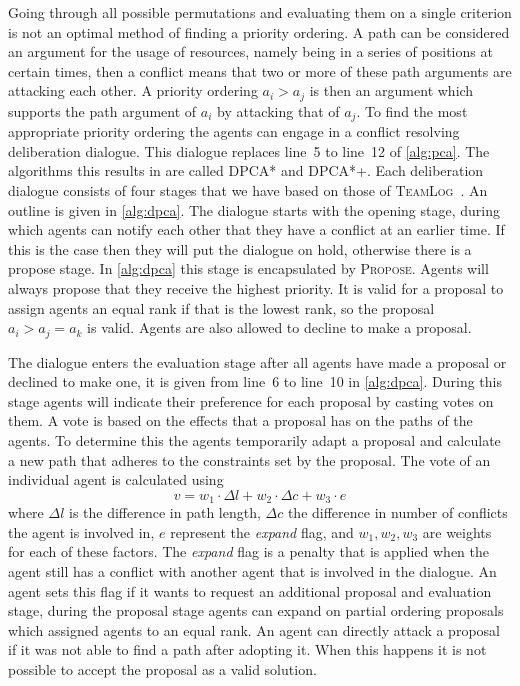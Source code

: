 Going through all possible permutations and evaluating them on a single
criterion is not an optimal method of finding a priority ordering. A path can 
be 
considered an argument for the usage of resources, namely being in a series of 
positions at certain times, then a conflict means that two or more of these path 
arguments are attacking each other. A 
priority ordering $a_i > a_j$ is then an argument which supports the path 
argument 
of $a_i$ by attacking that of $a_j$. To find the most appropriate priority 
ordering the agents can engage in a conflict resolving deliberation dialogue. 
This 
dialogue replaces line~5 to line~12 of \autoref{alg:pca}.
The algorithms this results in are called DPCA* and DPCA*+. Each deliberation 
dialogue consists of four stages that we have based on those of 
\textsc{TeamLog}~\cite{dunin-keplicz2011}. An outline is given in \autoref{alg:dpca}. The dialogue 
starts with the opening stage, during which agents can notify each other that 
they have a conflict at an earlier time. If this is the case then they will put 
the dialogue on hold, otherwise there is a propose stage. In \autoref{alg:dpca} 
this stage is encapsulated by \textsc{Propose}. Agents will always propose that 
they receive the highest priority. It is valid for a proposal to assign agents 
an equal rank if that is the lowest rank, so the proposal $a_i > a_j = a_k$ is 
valid. Agents are 
also allowed to decline to make a proposal.

The dialogue enters the evaluation stage after all agents have made a 
proposal or declined to make one, it is given from line~6 to line~10 in 
\autoref{alg:dpca}. During this stage agents will indicate their preference for 
each proposal by casting votes on them. A vote is based on the effects that a 
proposal has on the paths of the agents. To determine this the agents 
temporarily adapt a proposal and calculate a new path that adheres to the 
constraints set by the proposal.
The vote of an individual agent is calculated using
\[ v = w_1 \cdot \Delta l + w_2 \cdot \Delta c + w_3 \cdot e \]
where $\Delta l$ is the difference in path length, $\Delta c$ the difference in 
number of conflicts the agent is involved in, $e$ represent the \emph{expand} 
flag, and $w_1, w_2, w_3$ are weights for each of these factors. The 
\emph{expand} flag is a penalty that is applied when the agent still has a 
conflict with another agent that is involved in 
the dialogue. An agent sets this flag if it wants to request an additional 
proposal and evaluation stage, during the proposal stage agents can expand on 
partial ordering proposals which assigned agents to an equal rank. An agent can 
directly attack a proposal if it was not able to find a path after adopting it. 
When this happens it is not possible to accept the proposal as a valid solution.

